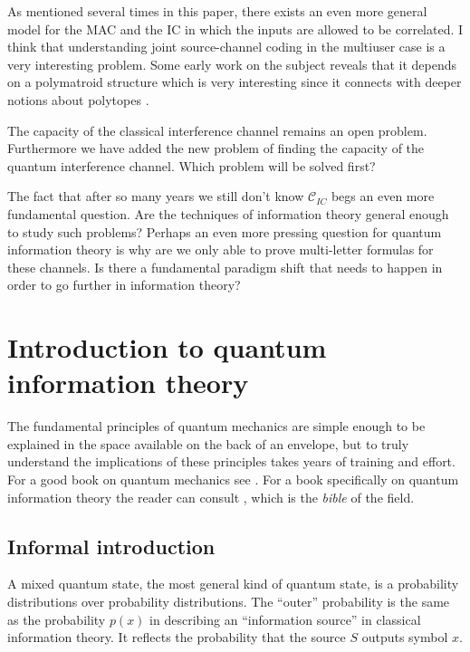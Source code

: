 \documentclass[aps,11pt,twoside,letterpaper]{article}
\newcommand{\ICcap}{  \ensuremath{\mathcal C}_{IC} }
\begin{document}
        
        As mentioned several times in this paper, there exists an even more general
        model for the MAC and the IC in which the inputs are allowed to be correlated.
        I think that understanding joint source-channel coding in the multiuser case
        is a very interesting problem. Some early work on the subject \cite{cover1980multiple}
        reveals that it depends on a polymatroid structure which is very interesting
        since it connects with deeper notions about polytopes \cite{E69, poly}.
        

        The capacity of the classical interference channel remains an open problem.
        Furthermore we have added the new problem of finding the capacity of the
        quantum interference channel. Which problem will be solved first?

	The fact that after so many years we still don't know $\ICcap$ begs 
	an even more fundamental question. 
	Are the techniques of information theory general enough to study such problems?
	Perhaps an even more pressing question for quantum information theory is why are we only
	able to prove multi-letter formulas for these channels.
	Is there a fundamental paradigm shift that needs to happen in order to go further in information theory?


\appendix


\section{Introduction to quantum information theory}           \label{section:intro_to_qit}


	The fundamental principles of quantum mechanics are simple enough to be explained in the space
	available on the back of an envelope, but to truly understand the implications of these
	principles takes years of training and effort.
	For a good book on quantum mechanics see \cite{sakurai}. 
	For a book specifically on quantum information theory the reader can consult \cite{NC04}, which
	is the \emph{bible} of the field.

   
	   \subsection{Informal introduction}

	        A mixed quantum state, the most general kind of quantum state, is a
	        probability distributions over probability distributions.
	        The ``outer'' probability is the same as the probability $p(x)$ in describing 
	        an ``information source'' in classical information theory.
	        It reflects the probability that the source $S$ outputs symbol $x$.
\end{document}
